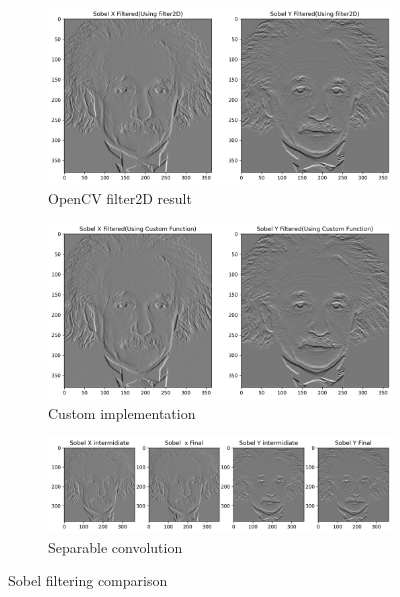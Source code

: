 \documentclass[10pt,a4paper]{article}
\begin{document}
\begin{figure}[H]
    \centering
    \begin{subfigure}{0.32\textwidth}
        \includegraphics[width=\textwidth]{task7/sobel2D_filtered.png}
        \caption{OpenCV filter2D result}
    \end{subfigure}
    \begin{subfigure}{0.32\textwidth}
        \includegraphics[width=\textwidth]{task7/sobel_custom_filtered.png}
        \caption{Custom implementation}
    \end{subfigure}
    \begin{subfigure}{0.32\textwidth}
        \includegraphics[width=\textwidth]{task7/sobel_combined_filtered.png}
        \caption{Separable convolution}
    \end{subfigure}
    \caption{Sobel filtering comparison}
\end{figure}
\end{document}
